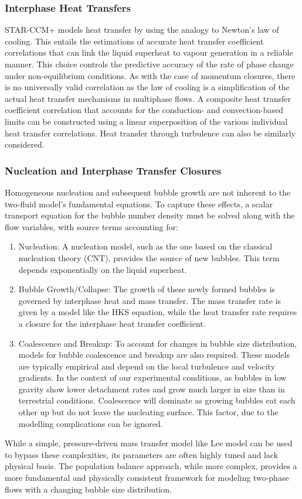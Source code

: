 \subsubsection{Interphase Heat Transfers}
STAR-CCM+ models heat transfer by using the analogy to Newton's law of cooling. This entails the 
estimations of accurate heat transfer coefficient correlations that can link the 
liquid superheat to vapour generation in a reliable manner. This choice controls the predictive
accuracy of the rate of phase change under non-equilibrium conditions. As with the case of
momentum closures, there is no universally valid correlation as the law of cooling is a simplification
of the actual heat transfer mechanisms in multiphase flows. A composite heat transfer coefficient
correlation that accounts for the conduction- and convection-based limits can be constructed using 
a linear superposition of the various individual heat transfer correlations. Heat transfer through
turbulence can also be similarly considered. 

\subsubsection{Nucleation and Interphase Transfer Closures}
Homogeneous nucleation and subsequent bubble growth are not inherent to the two-fluid model's 
fundamental equations. To capture these effects, a scalar transport equation for the bubble number density must be solved along with the flow variables, with source terms accounting for:
\begin{enumerate}
    \item Nucleation: A nucleation model, such as the one based on the classical nucleation theory (CNT), provides the source of new bubbles. This term depends exponentially on the liquid superheat.
    \item Bubble Growth/Collapse: The growth of these newly formed bubbles is governed by interphase heat and mass transfer. The mass transfer rate is given by a model like the 
    HKS equation, while the heat transfer rate requires a closure for the interphase heat transfer coefficient.
    \item Coalescence and Breakup: To account for changes in bubble size distribution, models for bubble coalescence and breakup are also required. 
    These models are typically empirical and depend on the local turbulence and velocity gradients. In the context of our experimental conditions,
    as bubbles in low gravity show lower detachment rates and grow much larger in size than in terrestrial conditions. Coalescence will
    dominate as growing bubbles eat each other up but do not leave the nucleating surface. This factor, due to 
    the modelling complications can be ignored. 
\end{enumerate}
While a simple, pressure-driven mass transfer model like Lee model can be used to bypass these complexities, its parameters are often highly tuned and lack physical basis. 
The population balance approach, while more complex, provides a more fundamental and physically consistent framework for modeling two-phase flows with a changing bubble size distribution.

